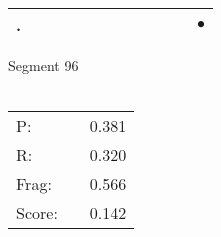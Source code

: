 \documentclass[landscape]{article}
\newcommand{\ssp}{\hspace{2pt}}
\newcommand{\mex}{\cellcolor{g}$\bullet$}
\begin{document}
\begin{tabular}{|l|p{10pt}|p{10pt}|p{10pt}|p{10pt}|p{10pt}|p{10pt}|p{10pt}|p{10pt}|p{10pt}|p{10pt}|p{10pt}|}
\hline
\ssp \cellcolor{ref10}. \ssp&\hspace{2pt}&\hspace{2pt}&\hspace{2pt}&\hspace{2pt}&\hspace{2pt}&\hspace{2pt}&\hspace{2pt}&\hspace{2pt}&\hspace{2pt}&\hspace{2pt}&\hspace{2pt}\mex\\
\hline
\end{tabular}

\vspace{6pt}
\noindent Segment 96\\\\
\noindent\begin{tabular}{lm{12pt}r}
\hline
P:&&0.381\\
R:&&0.320\\
Frag:&&0.566\\
Score:&&0.142\\
\end{tabular}

\newpage
\end{document}
